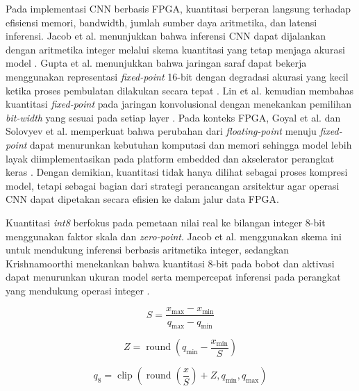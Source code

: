   Pada implementasi CNN berbasis FPGA, kuantitasi berperan langsung terhadap
  efisiensi memori, bandwidth, jumlah sumber daya aritmetika, dan latensi
  inferensi. Jacob et al. menunjukkan bahwa inferensi CNN dapat dijalankan dengan
  aritmetika integer melalui skema kuantitasi yang tetap menjaga akurasi model
  \cite{Jacob2018Quantization}. Gupta et al. menunjukkan bahwa jaringan saraf
  dapat bekerja menggunakan representasi \emph{fixed-point} 16-bit dengan degradasi
  akurasi yang kecil ketika proses pembulatan dilakukan secara tepat
  \cite{Gupta2015LimitedPrecision}. Lin et al. kemudian membahas kuantitasi
  \emph{fixed-point} pada jaringan konvolusional dengan menekankan pemilihan
  \emph{bit-width} yang sesuai pada setiap layer \cite{Lin2016FixedPointQuantization}.
  Pada konteks FPGA, Goyal et al. dan Solovyev et al. memperkuat bahwa perubahan
  dari \emph{floating-point} menuju \emph{fixed-point} dapat menurunkan kebutuhan
  komputasi dan memori sehingga model lebih layak diimplementasikan pada platform
  embedded dan akselerator perangkat keras
  \cite{Goyal2021FixedPointCNN,Solovyev2019FixedPointCNN}. Dengan demikian,
  kuantitasi tidak hanya dilihat sebagai proses kompresi model, tetapi sebagai
  bagian dari strategi perancangan arsitektur agar operasi CNN dapat dipetakan
  secara efisien ke dalam jalur data FPGA.

  Kuantitasi \emph{int8} berfokus pada pemetaan nilai real ke bilangan integer 8-bit
  menggunakan faktor skala dan \emph{zero-point}. Jacob et al. menggunakan skema
  ini untuk mendukung inferensi berbasis aritmetika integer, sedangkan
  Krishnamoorthi menekankan bahwa kuantitasi 8-bit pada bobot dan aktivasi dapat
  menurunkan ukuran model serta mempercepat inferensi pada perangkat yang mendukung
  operasi integer \cite{Jacob2018Quantization,Krishnamoorthi2018QuantizingCNN}.

  \begin{equation}
      S = \frac{x_{\max} - x_{\min}}{q_{\max} - q_{\min}}
      \label{eq:int8_scale}
  \end{equation}

  \begin{equation}
      Z =
      \operatorname{round}
      \left(
      q_{\min} - \frac{x_{\min}}{S}
      \right)
      \label{eq:int8_zero_point}
  \end{equation}

  \begin{equation}
      q_8 =
      \operatorname{clip}
      \left(
      \operatorname{round}
      \left(
      \frac{x}{S}
      \right)
      + Z,
      q_{\min},
      q_{\max}
      \right)
      \label{eq:int8_quantization}
  \end{equation}

